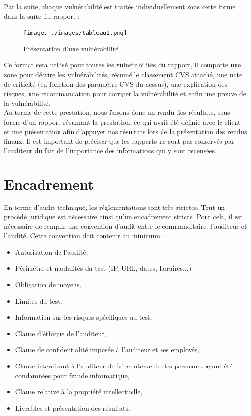 \documentclass[a4paper]{memoir}
\begin{document}
Par la suite, chaque vulnérabilité est traitée individuellement sous cette forme dans la suite du rapport : 

\begin{figure}[!ht]
    \center
    \texttt{[image: ./images/tableau1.png]}
    \caption{Présentation d'une vulnérabilité}
    \label{ID}
\end{figure}

Ce format sera utilisé pour toutes les vulnérabilités du rapport, il comporte une zone pour décrire les vulnérabilités, résumé le classement CVS attaché, une note de criticité (en fonction des paramètre CVS du dessus), une explication des risques, une recommandation pour corriger la vulnérabilité et enfin une preuve de la vulnérabilité.\\

Au terme de cette prestation, nous faisons donc un rendu des résultats, sous forme d'un rapport résumant la prestation, ce qui avait été définie avec le client et une présentation afin d'appuyer nos résultats lors de la présentation des rendus finaux.
Il est important de préciser que les rapports ne sont pas conservés par l'auditeur du fait de l'importance des informations qui y sont recensées.

\chapter{Encadrement}

En terme d'audit technique, les réglementations sont très strictes. Tout un procédé juridique est nécessaire ainsi qu'un encadrement stricte. Pour cela, il est nécessaire de remplir une convention d'audit entre le commanditaire, l'auditeur et l'audité. Cette convention doit contenir au minimum : 

	\begin{itemize}
		\item Autorisation de l'audité,
		\item Périmètre et modalités du test (IP, URL, dates, horaires...),
		\item Obligation de moyens,
		\item Limites du test,
		\item Information sur les risques spécifiques au test,
		\item Clause d'éthique de l'auditeur,
		\item Clause de confidentialité imposée à l'auditeur et ses employés,
		\item Clause interdisant à l'auditeur de faire intervenir des personnes ayant été condamnées pour fraude informatique,
		\item Clause relative à la propriété intellectuelle,
		\item Livrables et présentation des résultats.
\end{itemize}
\end{document}
